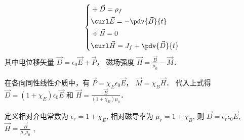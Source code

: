 
\begin{equation}
\left\{\begin{aligned}
&\div\vec D = \rho_f\\
&\curl\vec E = -\pdv{\vec B}{t}\\
&\div\vec B = 0\\
&\curl\vec H = J_f + \pdv{\vec D}{t}
\end{aligned} \right.
\end{equation}
其中电位移矢量 $\vec D = {\epsilon_0}\vec E + \vec P$，  磁场强度 $\vec H = \frac{\vec B}{\mu_0} - \vec M$．

在各向同性线性介质中，有 $\vec P = {\chi_E}{\epsilon_0}\vec E$，  $\vec M = {\chi_B}\vec H$．  代入上式得 $\vec D = (1 + \chi_E)\epsilon_0\vec E$
  和  $\vec H = \frac{\vec B}{(1 + \chi_B)\mu_0}$． 

定义相对介电常数为 $\epsilon_r = 1 + \chi_E$, 相对磁导率为 $\mu_r = 1 + \chi_B$, 则 $\vec D = \epsilon_r\epsilon_0\vec E$, $\vec H = \frac{\vec B}{\mu_r\mu_0}$
 ,  
